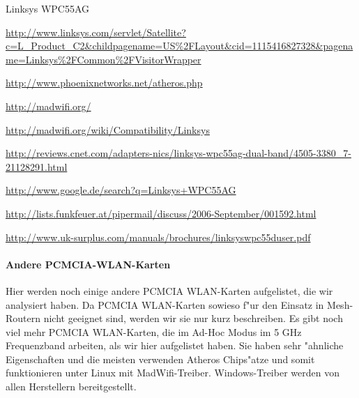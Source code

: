 \begin{wlandevice}{Linksys WPC55AG}
\begin{wlanlink}
\item \url{http://www.linksys.com/servlet/Satellite?c=L_Product_C2&childpagename=US\%2FLayout&cid=1115416827328&pagename=Linksys\%2FCommon\%2FVisitorWrapper}
\item \url{http://www.phoenixnetworks.net/atheros.php}
\item \url{http://madwifi.org/}
\item \url{http://madwifi.org/wiki/Compatibility/Linksys}
\item \url{http://reviews.cnet.com/adapters-nics/linksys-wpc55ag-dual-band/4505-3380_7-21128291.html}
\item \url{http://www.google.de/search?q=Linksys+WPC55AG}
\item \url{http://lists.funkfeuer.at/pipermail/discuss/2006-September/001592.html}
\item \url{http://www.uk-surplus.com/manuals/brochures/linksyswpc55duser.pdf}
\end{wlanlink}

\end{wlandevice}

\paragraph{Andere PCMCIA-WLAN-Karten}\mbox{}

Hier werden noch einige andere PCMCIA WLAN-Karten aufgelistet, die wir
analysiert haben. Da PCMCIA WLAN-Karten sowieso f"ur den Einsatz in
Mesh-Routern nicht geeignet sind, werden wir sie nur kurz beschreiben.
Es gibt noch viel mehr PCMCIA WLAN-Karten, die im Ad-Hoc Modus im 5 GHz
Frequenzband arbeiten, als wir hier aufgelistet haben. Sie haben sehr
"ahnliche Eigenschaften und die meisten verwenden Atheros Chips"atze
und somit funktionieren unter Linux mit MadWifi-Treiber. Windows-Treiber
werden von allen Herstellern bereitgestellt.

